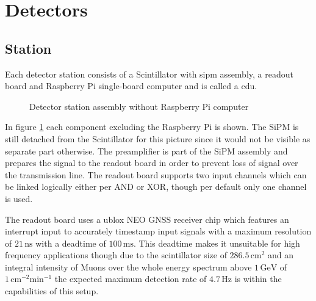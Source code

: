\documentclass[abstract,toc,los,lof,english,10pt,glossary,acronyms,lotl]{jluthesis}
\begin{document}
\section{Detectors}
\subsection{Station}
Each detector station consists of a Scintillator with \acrshort{sipm} assembly, a readout board and Raspberry Pi single-board computer and is called a \acrfull{cdu}.
\begin{figure}[H]
	\centering
	\caption{Detector station assembly without Raspberry Pi computer}
	\label{fig:station_assembly}
\end{figure}
In figure \ref{fig:station_assembly} each component excluding the Raspberry Pi is shown. The SiPM is still detached from the Scintillator for this picture since it would not be visible as separate part otherwise. The preamplifier is part of the SiPM assembly and prepares the signal to the readout board in order to prevent loss of signal over the transmission line. The readout board supports two input channels which can be linked logically either per AND or XOR, though per default only one channel is used.

The readout board uses a ublox NEO GNSS receiver chip which features an interrupt input to accurately timestamp input signals with a maximum resolution of $21\,\text{ns}$ \cite{ublox-datasheet} with a deadtime of $100\,\text{ms}$.
This deadtime makes it unsuitable for high frequency applications though due to the scintillator size of $286.5\,\text{cm}^2$ and an integral intensity of Muons over the whole energy spectrum above $1\,\text{GeV}$ of $1\,\text{cm}^{-2}\text{min}^{-1}$\cite[512]{10.1093/ptep/ptaa104} the expected maximum detection rate of $4.7\,\text{Hz}$ is within the capabilities of this setup. \\
\end{document}
